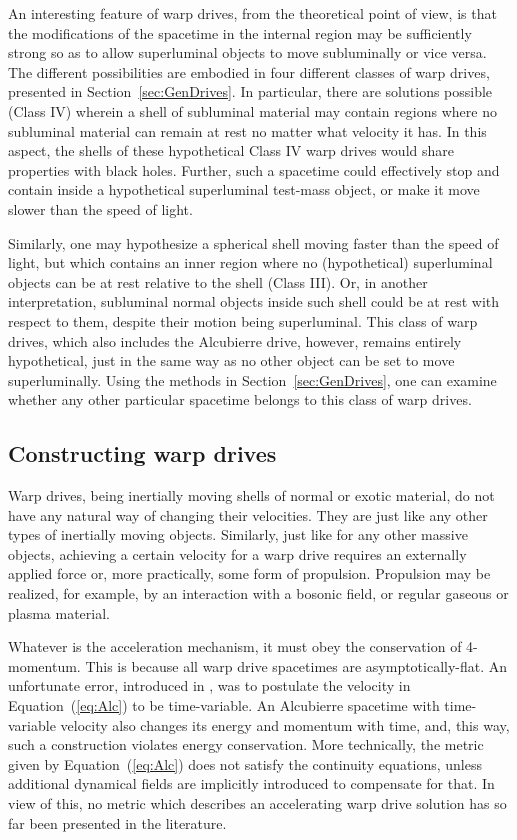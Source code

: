\documentclass[10pt]{iopart}
\begin{document}
An interesting feature of warp drives, from the theoretical point of view, is that the modifications of the spacetime in the internal region may be sufficiently strong so as to allow superluminal objects to move subluminally or vice versa. The different possibilities are embodied in four different classes of warp drives, presented in Section~\ref{sec:GenDrives}. In particular, there are solutions possible (Class IV) wherein a shell of subluminal material may contain regions where no subluminal material can remain at rest no matter what velocity it has. In this aspect, the shells of these hypothetical Class IV warp drives would share properties with black holes. Further, such a spacetime could effectively stop and contain inside a hypothetical superluminal test-mass object, or make it move slower than the speed of light. 

Similarly, one may hypothesize a spherical shell moving faster than the speed of light, but which contains an inner region where no (hypothetical) superluminal objects can be at rest relative to the shell (Class III). Or, in another interpretation, subluminal normal objects inside such shell could be at rest with respect to them, despite their motion being superluminal. This class of warp drives, which also includes the Alcubierre drive, however, remains entirely hypothetical, just in the same way as no other object can be set to move superluminally. { Using the methods in Section~\ref{sec:GenDrives}, one can examine whether any other particular spacetime belongs to this class of warp drives.} 


\subsection{Constructing warp drives}

Warp drives, being inertially moving shells of normal or exotic material, do not have any natural way of changing their velocities. They are just like any other types of inertially moving objects. Similarly, just like for any other massive objects, achieving a certain velocity for a warp drive requires an externally applied force or, more practically, some form of propulsion. Propulsion may be realized, for example, by an interaction with a bosonic field, or regular gaseous or plasma material.

Whatever is the acceleration mechanism, it must obey the conservation of 4-momentum. This is because all warp drive spacetimes are asymptotically-flat. An unfortunate error, introduced in \cite{Alcubierre1994}, was to postulate the velocity in Equation~(\ref{eq:Alc}) to be time-variable. An Alcubierre spacetime with time-variable velocity also changes its energy and momentum with time, and, this way, such a construction violates energy conservation. More technically, the metric given by Equation~(\ref{eq:Alc}) does not satisfy the continuity equations, unless additional dynamical fields are implicitly introduced to compensate for that. In view of this, no metric which describes an accelerating warp drive solution has so far been presented in the literature.
\end{document}
